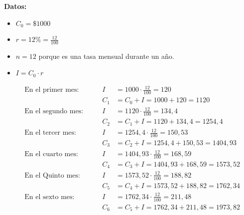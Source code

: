 \documentclass[12pt]{examdesign}
\theoremstyle{plain}
\theoremstyle{definition}
\theoremstyle{remark}
\begin{document}
\begin{shortanswer}[title={Leemos el material de consulta y realizamos las actividades propuestas.}, rearrange=no]
\begin{question}
\begin{answer}
\begin{enumerate}
    	    		\textbf{Datos:}
    	    		
    	    		\begin{itemize}
    	    			\item $C_{0}=\$1000$
    	    			\item $r=12\%=\displaystyle{\frac{12}{100}}$
    	    			\item $n=12$ porque es una tasa mensual durante un año.
    	    			\item $I=C_0\cdot r$
    	    		\end{itemize}
    	    		
    	    		\begin{align*}
    	    		    &\mbox{En el primer mes: }     &&&                   I&=1000\cdot\frac{12}{100}=120  
    	    		    \\
    	    		    &                              &&&               C_{1}&=C_{0}+I=1000+120=1120         
    	    		    \\[0.2cm]
    	    		    &\mbox{En el segundo mes: }    &&&                   I&=1120\cdot \frac{12}{100}=134,4 
    	    		    \\
    	    		    &                              &&&               C_{2}&=C_{1}+I = 1120 +134,4= 1254,4      
    	    		    \\[0.2cm]
    	    		    &\mbox{En el tercer mes: }     &&&                   I&=1254,4\cdot \frac{12}{100}=150,53
    	    		    \\
    	    		    &                              &&&               C_{3}&=C_{2}+I = 1254,4 + 150,53=1404,93
    	    		    \\[0.2cm]
    	    		    &\mbox{En el cuarto mes: }     &&&                   I&= 1404,93 \cdot \frac{12}{100}=168,59
    	    		    \\
    	    		    &                              &&&               C_{4}&=C_{3}+I = 1404,93 + 168,59=1573,52
    	    		    \\[0.2cm]
    	    		    &\mbox{En el Quinto mes: }     &&&                   I&= 1573,52 \cdot \frac{12}{100}=188,82
    	    		    \\
    	    		    &                              &&&               C_{5}&=C_{4}+I = 1573,52 + 188,82=1762,34
    	    		    \\[0.2cm]
    	    		    &\mbox{En el sexto mes: }      &&&                   I&= 1762,34 \cdot \frac{12}{100} = 211,48
    	    		    \\
    	    		    &                              &&&               C_{6}&=C_{5}+I = 1762,34 +  211,48  = 1973,82

\end{align*}
\end{enumerate}
\end{answer}
\end{question}
\end{shortanswer}
\end{document}
